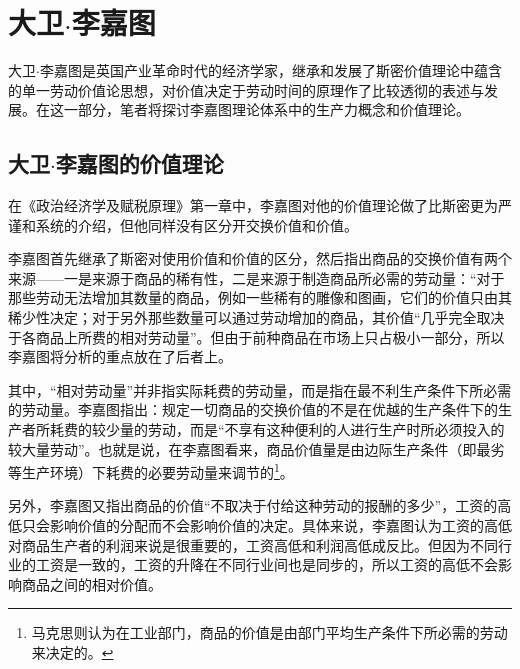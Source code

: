 \section{大卫$\cdot$李嘉图}

大卫$\cdot$李嘉图是英国产业革命时代的经济学家，继承和发展了斯密价值理论中蕴含的单一劳动价值论思想，对价值决定于劳动时间的原理作了比较透彻的表述与发展\cite[iv]{DaWei*LiJiaTuZhengZhiJingJiXueJiFuShuiYuanLi2021}。在这一部分，笔者将探讨李嘉图理论体系中的生产力概念和价值理论。

\subsection{大卫$\cdot$李嘉图的价值理论}

在《政治经济学及赋税原理》第一章中，李嘉图对他的价值理论做了比斯密更为严谨和系统的介绍，但他同样没有区分开交换价值和价值。

李嘉图首先继承了斯密对使用价值和价值的区分，然后指出商品的交换价值有两个来源——一是来源于商品的稀有性，二是来源于制造商品所必需的劳动量\cite[5-6]{DaWei*LiJiaTuZhengZhiJingJiXueJiFuShuiYuanLi2021}：“对于那些劳动无法增加其数量的商品，例如一些稀有的雕像和图画，它们的价值只由其稀少性决定；对于另外那些数量可以通过劳动增加的商品，其价值“几乎完全取决于各商品上所费的相对劳动量”。\cite[6]{DaWei*LiJiaTuZhengZhiJingJiXueJiFuShuiYuanLi2021}但由于前种商品在市场上只占极小一部分，所以李嘉图将分析的重点放在了后者上。

其中，“相对劳动量”并非指实际耗费的劳动量，而是指在最不利生产条件下所必需的劳动量\cite[16]{LiRenJunJieZhiLiLun2004}。李嘉图指出：规定一切商品的交换价值的不是在优越的生产条件下的生产者所耗费的较少量的劳动，而是“不享有这种便利的人进行生产时所必须投入的较大量劳动”\cite[58]{DaWei*LiJiaTuZhengZhiJingJiXueJiFuShuiYuanLi2021}。也就是说，在李嘉图看来，商品价值量是由边际生产条件（即最劣等生产环境）下耗费的必要劳动量来调节的\cite[9]{ChenZhenYuLunSheHuiBiYaoLaoDongShiJianXueShuoCongGuDianXuePaiDaoMaKeSiDeFaZhan1990}\footnote{马克思则认为在工业部门，商品的价值是由部门平均生产条件下所必需的劳动来决定的\cite[16]{LiRenJunJieZhiLiLun2004}。}。

另外，李嘉图又指出商品的价值“不取决于付给这种劳动的报酬的多少”\cite[5]{DaWei*LiJiaTuZhengZhiJingJiXueJiFuShuiYuanLi2021}，工资的高低只会影响价值的分配而不会影响价值的决定。具体来说，李嘉图认为工资的高低对商品生产者的利润来说是很重要的，工资高低和利润高低成反比。但因为不同行业的工资是一致的，工资的升降在不同行业间也是同步的，所以工资的高低不会影响商品之间的相对价值\cite[19]{DaWei*LiJiaTuZhengZhiJingJiXueJiFuShuiYuanLi2021}。

